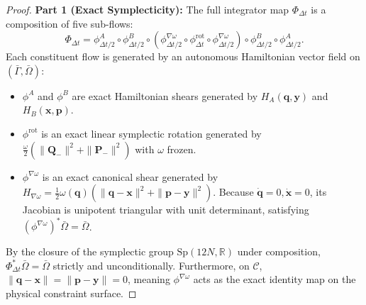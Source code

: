 \documentclass[11pt,a4paper,reqno]{article}
\theoremstyle{plain}
\theoremstyle{definition}
\theoremstyle{remark}
\numberwithin{equation}{section}
\begin{document}
\begin{proof}
\textbf{Part 1 (Exact Symplecticity):} The full integrator map $\Phi_{\Delta t}$ is a composition of five sub-flows:
\begin{equation}
\Phi_{\Delta t} = \phi_{\Delta t / 2}^A \circ \phi_{\Delta t / 2}^B \circ \left( \phi_{\Delta t / 2}^{\nabla \omega} \circ \phi_{\Delta t}^{\mathrm{rot}} \circ \phi_{\Delta t / 2}^{\nabla \omega} \right) \circ \phi_{\Delta t / 2}^B \circ \phi_{\Delta t / 2}^A.
\end{equation}
Each constituent flow is generated by an autonomous Hamiltonian vector field on $(\bar{\Gamma}, \bar{\Omega})$:
\begin{itemize}
    \item $\phi^A$ and $\phi^B$ are exact Hamiltonian shears generated by $H_A(\bm{q}, \bm{y})$ and $H_B(\bm{x}, \bm{p})$.
    \item $\phi^{\mathrm{rot}}$ is an exact linear symplectic rotation generated by $\frac{\omega}{2}(\|\bm{Q}_-\|^2 + \|\bm{P}_-\|^2)$ with $\omega$ frozen.
    \item $\phi^{\nabla \omega}$ is an exact canonical shear generated by $H_{\nabla \omega} = \frac{1}{2} \omega(\bm{q}) (\|\bm{q} - \bm{x}\|^2 + \|\bm{p} - \bm{y}\|^2)$. Because $\dot{\bm{q}} = 0, \dot{\bm{x}} = 0$, its Jacobian is unipotent triangular with unit determinant, satisfying $(\phi^{\nabla \omega})^* \bar{\Omega} = \bar{\Omega}$.
\end{itemize}
By the closure of the symplectic group $\mathrm{Sp}(12N, \mathbb{R})$ under composition, $\Phi_{\Delta t}^* \bar{\Omega} = \bar{\Omega}$ strictly and unconditionally. Furthermore, on $\mathcal{C}$, $\|\bm{q} - \bm{x}\| = \|\bm{p} - \bm{y}\| = 0$, meaning $\phi^{\nabla \omega}$ acts as the exact identity map on the physical constraint surface.


\end{proof}
\end{document}
